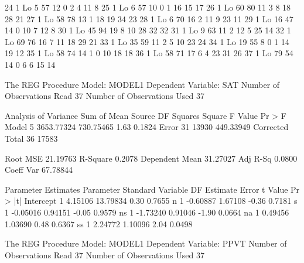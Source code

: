 \documentclass{article}
\begin{document}
\begin{Woutput}
 24      1      Lo       5     57       12      0     2     4    11     8
 25      1      Lo       6     57       10      0     1    16    15    17
 26      1      Lo      60     80       11      3     8    18    28    21
 27      1      Lo      58     78       13      1    18    19    34    23
 28      1      Lo       6     70       16      2    11     9    23    11
 29      1      Lo      16     47       14      0    10     7    12     8
 30      1      Lo      45     94       19      8    10    28    32    32
 31      1      Lo       9     63       11      2    12     5    25    14
 32      1      Lo      69     76       16      7    11    18    29    21
 33      1      Lo      35     59       11      2     5    10    23    24
 34      1      Lo      19     55        8      0     1    14    19    12
 35      1      Lo      58     74       14      1     0    10    18    18
 36      1      Lo      58     71       17      6     4    23    31    26
 37      1      Lo      79     54       14      0     6     6    15    14

The REG Procedure
Model: MODEL1
Dependent Variable: SAT
Number of Observations Read          37
Number of Observations Used          37

                             Analysis of Variance
                                    Sum of           Mean
Source                   DF        Squares         Square    F Value    Pr > F
Model                     5     3653.77324      730.75465       1.63    0.1824
Error                    31          13930      449.33949
Corrected Total          36          17583

Root MSE             21.19763    R-Square     0.2078
Dependent Mean       31.27027    Adj R-Sq     0.0800
Coeff Var            67.78844

                        Parameter Estimates
                     Parameter       Standard
Variable     DF       Estimate          Error    t Value    Pr > |t|
Intercept     1        4.15106       13.79834       0.30      0.7655
n             1       -0.60887        1.67108      -0.36      0.7181
s             1       -0.05016        0.94151      -0.05      0.9579
ns            1       -1.73240        0.91046      -1.90      0.0664
na            1        0.49456        1.03690       0.48      0.6367
ss            1        2.24772        1.10096       2.04      0.0498

The REG Procedure
Model: MODEL1
Dependent Variable: PPVT
Number of Observations Read          37
Number of Observations Used          37


\end{Woutput}
\end{document}
